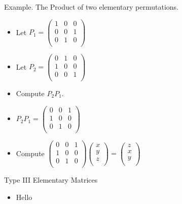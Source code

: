\documentclass{beamer}
\begin{document}
\begin{frame}{Example. The Product of two elementary permutations.}

\begin{itemize}
\item Let
$P_1=
\begin{pmatrix}
1 & 0 & 0 \\
0 & 0 & 1 \\
0 & 1 & 0 \\
\end{pmatrix}
$
\item Let
$P_2=
\begin{pmatrix}
0 & 1 & 0 \\
1 & 0 & 0 \\
0 & 0 & 1 \\
\end{pmatrix}
$
\item Compute $P_2 P_1$.
\item $P_2 P_1=
\begin{pmatrix}
0 & 0 & 1 \\
1 & 0 & 0 \\
0 & 1 & 0 \\
\end{pmatrix}
$
\item Compute $
\begin{pmatrix}
0 & 0 & 1 \\
1 & 0 & 0 \\
0 & 1 & 0 \\
\end{pmatrix}
\begin{pmatrix}
x \\ y \\ z\\
\end{pmatrix}
=
\begin{pmatrix}
z \\ x \\ y\\
\end{pmatrix}
$
\end{itemize}
\end{frame}

\begin{frame}{Type III Elementary Matrices}

\begin{itemize}
\item Hello
\end{itemize}
\end{frame}
\end{document}
